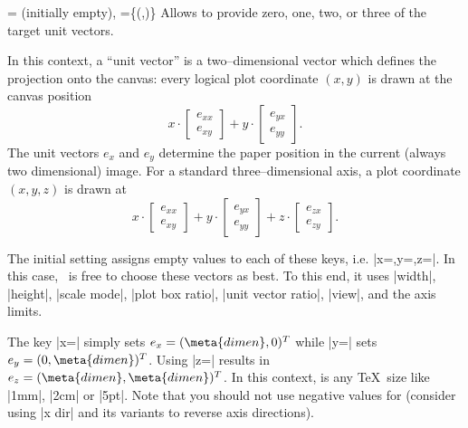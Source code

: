 \begin{pgfplotsxykeylist}{
	\x= (initially empty),
	\x={\{(,)\}}}
Allows to provide zero, one, two, or three of the target unit vectors. 

In this context, a ``unit vector'' is a two--dimensional vector which defines the projection onto the canvas:
every logical plot coordinate $(x,y)$ is drawn at the canvas position
\[ x \cdot \begin{bmatrix} e_{xx} \\ e_{xy} \end{bmatrix} + y \cdot \begin{bmatrix} e_{yx} \\ e_{yy} \end{bmatrix}. \]
The unit vectors $e_x$ and $e_y$ determine the paper position in the current (always two dimensional) image.
For a standard three--dimensional axis, a plot coordinate $(x,y,z)$ is drawn at 
\[ x \cdot \begin{bmatrix} e_{xx} \\ e_{xy} \end{bmatrix} + y \cdot \begin{bmatrix} e_{yx} \\ e_{yy} \end{bmatrix} + z \cdot \begin{bmatrix} e_{zx} \\ e_{zy} \end{bmatrix}. \]

The initial setting assigns empty values to each of these keys, i.e. |x={},y={},z={}|. In this case, \PGFPlots\ is free to choose these vectors as best. To this end, it uses |width|, |height|, |scale mode|, |plot box ratio|, |unit vector ratio|, |view|, and the axis limits.

The key |x=| simply sets $e_x = (\meta{dimen},0)^T $ while |y=| sets $e_y = (0,\meta{dimen})^T$. Using |z=| results in $e_z = (\meta{dimen},\meta{dimen})^T$. In this context,  is any \TeX\ size like |1mm|, |2cm| or |5pt|. Note that you should not use negative values for  (consider using |x dir| and its variants to reverse axis directions).
\begin{codeexample}[]
\end{codeexample}


\end{pgfplotsxykeylist}
